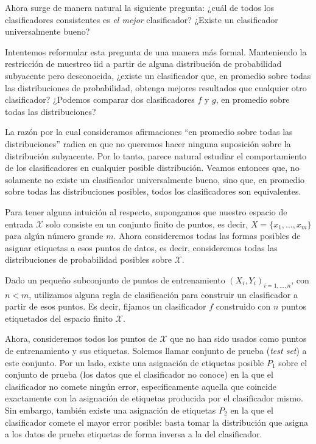 \documentclass{report}
\begin{document}
Ahora surge de manera natural la siguiente pregunta: ¿cuál de todos los clasificadores consistentes 
es \textit{el mejor} clasificador? ¿Existe un clasificador universalmente bueno?\newline

Intentemos reformular esta pregunta de una manera más formal. Manteniendo la restricción de muestreo iid
a partir de alguna distribución de probabilidad subyacente pero desconocida, ¿existe 
un clasificador que, en promedio sobre todas las distribuciones de probabilidad, obtenga mejores 
resultados que cualquier otro clasificador? ¿Podemos comparar dos clasificadores \(f\) y \(g\), 
en promedio sobre todas las distribuciones?\newline

La razón por la cual consideramos afirmaciones ``en promedio sobre todas las distribuciones'' radica 
en que no queremos hacer ninguna suposición sobre la distribución subyacente. Por lo tanto, parece 
natural estudiar el comportamiento de los clasificadores en cualquier posible distribución. Veamos entonces
que, no solamente no existe un clasificador universalmente bueno, sino que, en promedio sobre todas las distribuciones
posibles, todos los clasificadores son equivalentes.\newline

Para tener alguna intuición al respecto, supongamos que nuestro espacio de entrada \(\mathcal{X}\) solo consiste en un conjunto finito de puntos, es decir, 
\(X = \{x_1, \dots, x_m\}\) para algún número grande \(m\). Ahora consideremos todas las formas 
posibles de asignar etiquetas a esos puntos de datos, es decir, consideremos todas las distribuciones 
de probabilidad posibles sobre \(\mathcal{X}\). \newline

Dado un pequeño subconjunto de puntos de entrenamiento \((X_i, Y_i)_{i=1,\dots,n}\), con $n<m$, utilizamos 
alguna regla de clasificación para construir un clasificador a partir de esos puntos. Es decir, fijamos un clasificador $f$
construido con $n$ puntos etiquetados del espacio finito \(\mathcal{X}\).\newline

Ahora, consideremos todos los puntos de \(\mathcal{X}\) que no han sido usados como 
puntos de entrenamiento y sus etiquetas. Solemos llamar conjunto de prueba (\textit{test set}) a este conjunto.
Por un lado, existe una asignación de etiquetas posible \(P_1\) sobre el conjunto de prueba (los datos que el clasificador
no conoce) en la que el 
clasificador no comete ningún error, específicamente aquella que coincide exactamente con la asignación 
de etiquetas producida por el clasificador mismo. Sin embargo, también existe una asignación de 
etiquetas \(P_2\) en la que el clasificador comete el mayor error posible: basta tomar la distribución
que asigna a los datos de prueba etiquetas de forma inversa a la del clasificador. \newline
\end{document}
